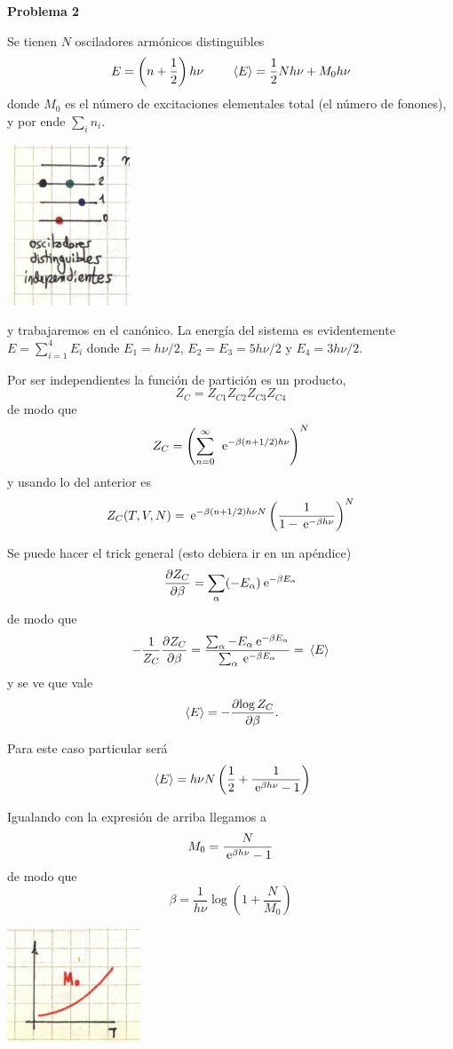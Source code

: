 \documentclass[10pt,oneside]{CBFT_book}
\begin{document}
\begin{ejemplo}{\bf Problema 2}

Se tienen $N$ osciladores armónicos distinguibles
\[
	E = \left( n + \frac 1 2 \right) h \nu \qquad \:\left\langle E \right\rangle = \frac{1}{2} N h \nu + M_0 h \nu
\]
donde $M_0$ es el número de excitaciones elementales total (el número de fonones), y
por ende $\sum_i n_i$.

\includegraphics[scale=0.5]{images/1606329412.jpg} 


y trabajaremos en el canónico. La energía del sistema es evidentemente $E = \sum_{i=1}^4 E_i $
donde $E_1 = h \nu / 2$, $E_2 = E_3 = 5 h \nu / 2$ y $E_4 = 3 h \nu / 2$.

Por ser independientes la función de partición es un producto,
\[
	Z_C = Z_{C1} Z_{C2} Z_{C3} Z_{C4}
\]
de modo que
\[
	Z_C = \left( \sum_{n=0}^\infty \: \:\mathrm{e}^{ -\beta ( n + 1/2 ) h \nu} \right)^N
\]
y usando lo del anterior es
\[
	Z_C(T,V,N) = \:\mathrm{e}^{ -\beta ( n + 1/2 ) h \nu N } \left( \frac{ 1 }{ 1- \:\mathrm{e}^{-\beta h \nu} } \right)^N
\]

Se puede hacer el trick general (esto debiera ir en un apéndice)
\[
	\frac{\partial^{\hspace{-0.05em}} {Z_C}}{\partial {\beta}^{\hspace{-0.05em}}} = \sum_\alpha (-E_\alpha) \:\mathrm{e}^{-\beta E_\alpha}
\]
de modo que 
\[
	-\frac{1}{Z_C} \frac{\partial^{\hspace{-0.05em}} {Z_C}}{\partial {\beta}^{\hspace{-0.05em}}} = \frac{ \sum_\alpha -E_\alpha \:\mathrm{e}^{-\beta E_\alpha} }
	{ \sum_\alpha \:\mathrm{e}^{-\beta E_\alpha} } = \:\left\langle E \right\rangle
\]
y se ve que vale 
\[
	\:\left\langle E \right\rangle = - \frac{\partial^{\hspace{-0.05em}} {\log Z_C}}{\partial {\beta}^{\hspace{-0.05em}}}.
\]

Para este caso particular será
\[
	\:\left\langle E \right\rangle = h \nu N \left( \frac{1}{2} + \frac{1}{\:\mathrm{e}^{\beta h \nu}-1}\right) 
\]

Igualando con la expresión de arriba llegamos a
\[
	M_0 = \frac{N}{\:\mathrm{e}^{\beta h \nu}-1}
\]
de modo que 
\[	
	\beta = \frac{1}{h\nu} \log \left( 1 + \frac{N}{M_0} \right)
\]

\includegraphics[scale=0.5]{images/1606329407.jpg} 



\end{ejemplo}
\end{document}
